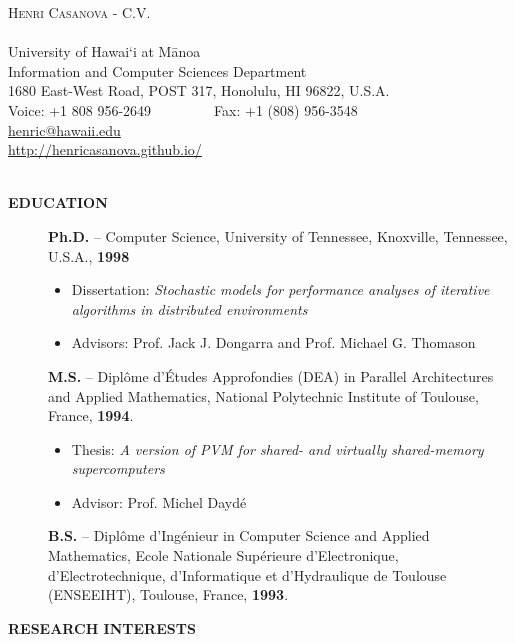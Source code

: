 \documentclass[times,11pt]{letter}
\begin{document}
\begin{center}
{\Large{\textsc{  Henri Casanova - C.V.}}}\\
~\\
University of Hawai`i at M\=anoa\\
Information and Computer Sciences Department\\
1680 East-West Road, POST 317, Honolulu, HI 96822, U.S.A.\\
Voice: +1 808 956-2649~~~~~~~~~Fax: +1 (808) 956-3548\\
\url{henric@hawaii.edu}~\\
\url{http://henricasanova.github.io/}~\\
\end{center}
~\\
\noindent
{\large{\bf EDUCATION}}

\begin{description}

\item []{\bf Ph.D.} -- Computer Science, University of Tennessee, Knoxville, Tennessee, U.S.A.,  {\bf 1998}
  \begin{itemize}
  \item[] Dissertation: {\it Stochastic models for performance analyses
  of iterative algorithms in distributed environments}
  \item[] Advisors: Prof. Jack J. Dongarra and Prof. Michael G. Thomason
  \end{itemize}


\item []{\bf M.S.} -- Dipl\^ome d'\'Etudes Approfondies (DEA) in Parallel
Architectures and Applied Mathematics, National Polytechnic Institute of Toulouse, France, {\bf 1994}.
  \begin{itemize}
  \item[] Thesis: {\it A version of PVM for shared- and virtually shared-memory supercomputers}
  \item[] Advisor: Prof. Michel Dayd\'e
  \end{itemize}

\item []{\bf B.S.} -- Dipl\^ome d'Ing\'enieur in Computer Science
and Applied Mathematics, Ecole Nationale Sup\'erieure d'Electronique,
d'Electrotechnique, d'Informatique et d'Hydraulique de Toulouse (ENSEEIHT), Toulouse, France, {\bf 1993}.
\end{description}

\noindent
{\large{\bf RESEARCH INTERESTS}}
\end{document}
